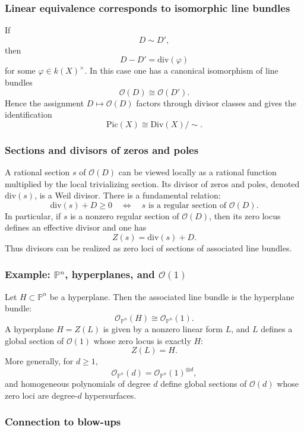 \documentclass[12pt,a4paper]{article}
\theoremstyle{plain}
\theoremstyle{definition}      %
\begin{document}
\subsubsection*{Linear equivalence corresponds to isomorphic line bundles}

If
\[
D\sim D',
\]
then
\[
D-D'=\mathrm{div}(\varphi)
\]
for some $\varphi\in k(X)^\times$.
In this case one has a canonical isomorphism of line bundles
\[
\mathcal O(D)\cong \mathcal O(D').
\]
Hence the assignment $D\mapsto \mathcal O(D)$ factors through divisor classes and gives the identification
\[
\mathrm{Pic}(X)\cong \mathrm{Div}(X)\big/\sim.
\]

\subsubsection*{Sections and divisors of zeros and poles}

A rational section $s$ of $\mathcal O(D)$ can be viewed locally as a rational function multiplied by the local trivializing section.
Its divisor of zeros and poles, denoted $\mathrm{div}(s)$, is a Weil divisor.
There is a fundamental relation:
\[
\mathrm{div}(s)+D\ge 0
\quad\Longleftrightarrow\quad
s \text{ is a regular section of } \mathcal O(D).
\]
In particular, if $s$ is a nonzero regular section of $\mathcal O(D)$, then its zero locus defines an effective divisor and one has
\[
Z(s)=\mathrm{div}(s)+D.
\]
Thus divisors can be realized as zero loci of sections of associated line bundles.

\subsubsection*{Example: $\mathbb P^n$, hyperplanes, and $\mathcal O(1)$}

Let $H\subset \mathbb P^n$ be a hyperplane.
Then the associated line bundle is the hyperplane bundle:
\[
\mathcal O_{\mathbb P^n}(H)\cong \mathcal O_{\mathbb P^n}(1).
\]
A hyperplane $H=Z(L)$ is given by a nonzero linear form $L$, and $L$ defines a global section of $\mathcal O(1)$ whose zero locus is exactly $H$:
\[
Z(L)=H.
\]
More generally, for $d\ge 1$,
\[
\mathcal O_{\mathbb P^n}(d)=\mathcal O_{\mathbb P^n}(1)^{\otimes d},
\]
and homogeneous polynomials of degree $d$ define global sections of $\mathcal O(d)$ whose zero loci are degree-$d$ hypersurfaces.

\subsubsection*{Connection to blow-ups}
\end{document}
